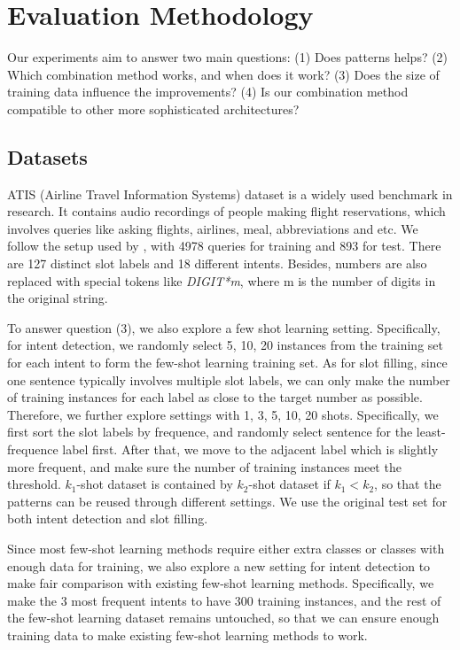 \section{Evaluation Methodology}
Our experiments aim to answer two main questions: (1) Does \RE patterns helps? (2) Which combination method works, and when does it work? (3) Does the size of training data influence the improvements? (4) Is our combination method compatible to other more sophisticated \NN architectures?  

\subsection{Datasets}
ATIS (Airline Travel Information Systems) dataset \cite{hemphill1990atis} is a widely used benchmark in \NLU research. It contains audio recordings of people making flight reservations, which involves queries like asking flights, airlines, meal, abbreviations and etc. We follow the setup used by \cite{liu2016attention}, with 4978 queries for training and 893 for test. There are 127 distinct slot labels and 18 different intents. Besides, numbers are also replaced with special tokens like \emph{DIGIT*m}, where m is the number of digits in the original string.

To answer question (3), we also explore a few shot learning setting. Specifically, for intent detection, we randomly select 5, 10, 20 instances from the training set for each intent to form the few-shot learning training set. As for slot filling, since one sentence typically involves multiple slot labels, we can only make the number of training instances for each label as close to the target number as possible. Therefore, we further explore settings with 1, 3, 5, 10, 20 shots. Specifically, we first sort the slot labels by frequence, and randomly select sentence for the least-frequence label first. After that, we move to the adjacent label which is slightly more frequent, and make sure the number of training instances meet the threshold. $k_1$-shot dataset is contained by $k_2$-shot dataset if $k_1 < k_2$, so that the \RE patterns can be reused through different settings. We use the original test set for both intent detection and slot filling.

Since most few-shot learning methods require either extra classes or classes with enough data for training, we also explore a new setting for intent detection to make fair comparison with existing few-shot learning methods. Specifically, we make the 3 most frequent intents to have 300 training instances, and the rest of the few-shot learning dataset remains untouched, so that we can ensure enough training data to make existing few-shot learning methods to work.

